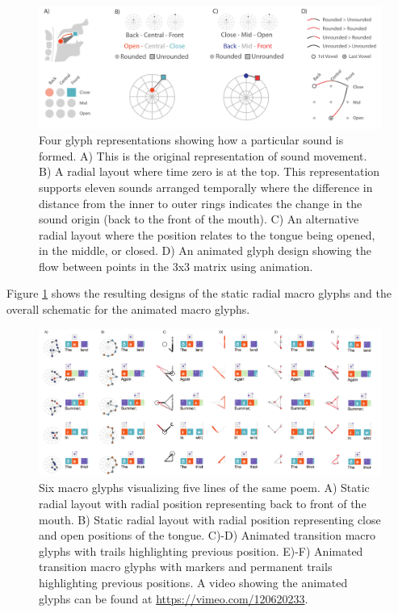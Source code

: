 \begin{figure}[t!]
\centering
\includegraphics[width=\textwidth]{images/other_glyphs/poem_macro_design}
\caption{Four glyph representations showing how a particular sound is formed.
A) This is the original representation of sound movement.
B) A radial layout where time zero is at the top. This representation supports eleven sounds arranged temporally where the difference in distance from the inner to outer rings indicates the change in the sound origin (back to the front of the mouth).
C) An alternative radial layout where the position relates to the tongue being opened, in the middle, or closed.
D) An animated glyph design showing the flow between points in the 3x3 matrix using animation.
}
\label{fig:macro_glyph}
\end{figure}

Figure \ref{fig:macro_glyph} shows the resulting designs of the static radial macro glyphs and the overall schematic for the animated macro glyphs.
 

\begin{figure}[t!]
\centering
\includegraphics[width=\textwidth]{images/other_glyphs/macros_options}
\caption{Six macro glyphs visualizing five lines of the same poem. 
A) Static radial layout with radial position representing back to front of the mouth.
B) Static radial layout with radial position representing close and open positions of the tongue.
C)-D) Animated transition macro glyphs with trails highlighting previous position. 
E)-F) Animated transition macro glyphs with markers and permanent trails highlighting previous positions.
A video showing the animated glyphs can be found at \url{https://vimeo.com/120620233}.
}
\label{fig:macro_glyph_implementation}
\end{figure}

